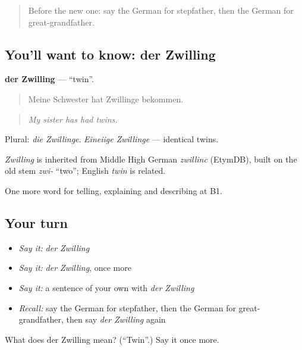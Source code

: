 \begin{quote}
Before the new one: say the German for stepfather, then the German for great-grandfather.
\end{quote}

\subsection*{You'll want to know: der Zwilling}
\textbf{der Zwilling} — \textquotedblleft{}twin\textquotedblright{}.

\begin{quote}
Meine Schwester hat Zwillinge bekommen.
\end{quote}

\begin{quote}
\emph{My sister has had twins.}
\end{quote}

Plural: \emph{die Zwillinge}. \emph{Eineiige Zwillinge} — identical twins.

\begin{cousinweb}
\emph{Zwilling} is inherited from Middle High German \emph{zwillinc} (EtymDB), built on the old stem \emph{zwi-} \textquotedblleft{}two\textquotedblright{}; English \emph{twin} is related.
\end{cousinweb}

\begin{grammarlens}[title={What you've built}]
One more word for telling, explaining and describing at B1.
\end{grammarlens}

\subsection*{Your turn}
\begin{itemize}
\raggedright
  \item \emph{Say it:} \emph{der Zwilling}
  \item \emph{Say it:} \emph{der Zwilling}, once more
  \item \emph{Say it:} a sentence of your own with \emph{der Zwilling}
  \item \emph{Recall:} say the German for stepfather, then the German for great-grandfather, then say \emph{der Zwilling} again
\end{itemize}

\begin{tcolorbox}[breakable,colback=teal!4,colframe=teal!35!black,title={Before you move on}]
What does der Zwilling mean? (\textquotedblleft{}Twin\textquotedblright{}.) Say it once more.
\end{tcolorbox}
